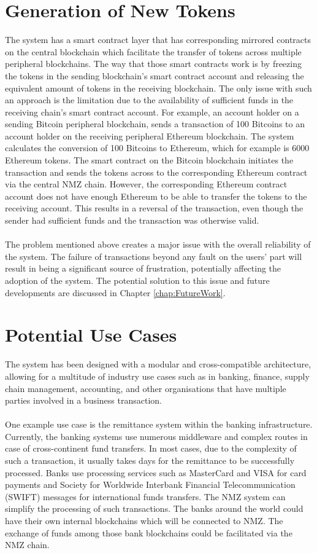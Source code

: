 \documentclass[a4paper,twoside,phd]{BYUPhys}
\begin{document}
\section{Generation of New Tokens}
The system has a smart contract layer that has corresponding mirrored contracts on the central blockchain which facilitate the transfer of tokens across multiple peripheral blockchains. The way that those smart contracts work is by freezing the tokens in the sending blockchain's smart contract account and releasing the equivalent amount of tokens in the receiving blockchain. The only issue with such an approach is the limitation due to the availability of sufficient funds in the receiving chain's smart contract account. For example, an account holder on a sending Bitcoin peripheral blockchain, sends a transaction of 100 Bitcoins to an account holder on the receiving peripheral Ethereum blockchain. The system calculates the conversion of 100 Bitcoins to Ethereum, which for example is 6000 Ethereum tokens. The smart contract on the Bitcoin blockchain initiates the transaction and sends the tokens across to the corresponding Ethereum contract via the central NMZ chain. However, the corresponding Ethereum contract account does not have enough Ethereum to be able to transfer the tokens to the receiving account. This results in a reversal of the transaction, even though the sender had sufficient funds and the transaction was otherwise valid. 
\\
\\
The problem mentioned above creates a major issue with the overall reliability of the system. The failure of transactions beyond any fault on the users' part will result in being a significant source of frustration, potentially affecting the adoption of the system. The potential solution to this issue and future developments are discussed in Chapter \ref{chap:FutureWork}.
\section{Potential Use Cases}
The system has been designed with a modular and cross-compatible architecture, allowing for a multitude of industry use cases such as in banking, finance, supply chain management, accounting, and other organisations that have multiple parties involved in a business transaction. 
\\
\\
One example use case is the remittance system within the banking infrastructure. Currently, the banking systems use numerous middleware and complex routes in case of  cross-continent fund transfers. In most cases, due to the complexity of such a transaction, it usually takes days for the remittance to be successfully processed. Banks use processing services such as MasterCard and VISA for card payments and Society for Worldwide Interbank Financial Telecommunication (SWIFT) messages for international funds transfers. The NMZ system can simplify the processing of such transactions. The banks around the world could have their own internal blockchains which will be connected to NMZ. The exchange of funds among those bank blockchains could be facilitated via the NMZ chain. 
\end{document}
